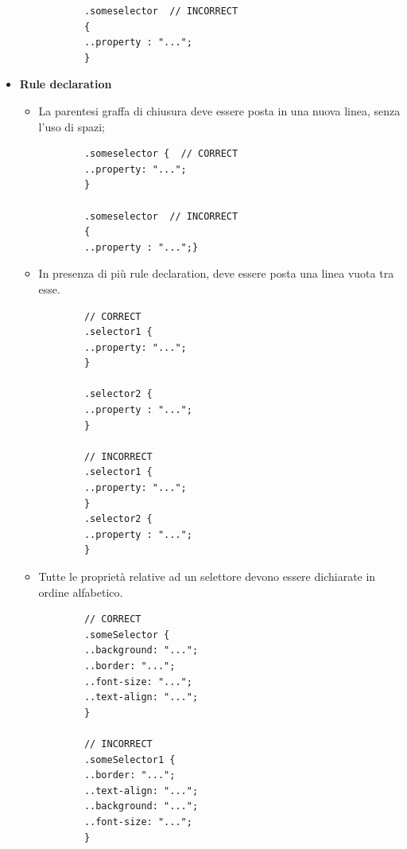 \begin{itemize}
\begin{itemize}
\begin{lstlisting}
		.someselector  // INCORRECT
		{  
		..property : "...";
		}
		\end{lstlisting}
	\end{itemize}
	\item{\textbf{Rule declaration}}
	\begin{itemize}
		\item{La parentesi graffa di chiusura deve essere posta in una nuova linea, senza l'uso di spazi;}
		\begin{lstlisting}
		.someselector {  // CORRECT
		..property: "...";
		}
		
		.someselector  // INCORRECT
		{  
		..property : "...";}
		\end{lstlisting}
		
		\item{In presenza di più rule declaration, deve essere posta una linea vuota tra esse.}
		\begin{lstlisting}
		// CORRECT
		.selector1 {  
		..property: "...";
		}
		
		.selector2 {    
		..property : "...";
		}
		
		// INCORRECT
		.selector1 {  
		..property: "...";
		}
		.selector2 {    
		..property : "...";
		}
		\end{lstlisting}
		\item{Tutte le proprietà relative ad un selettore devono essere dichiarate in ordine alfabetico.}
		\begin{lstlisting}
		// CORRECT
		.someSelector {  
		..background: "...";
		..border: "...";
		..font-size: "...";
		..text-align: "...";
		}
		
		// INCORRECT
		.someSelector1 {  
		..border: "...";
		..text-align: "...";
		..background: "...";
		..font-size: "...";
		}
		\end{lstlisting}
	\end{itemize} 	
\end{itemize}

